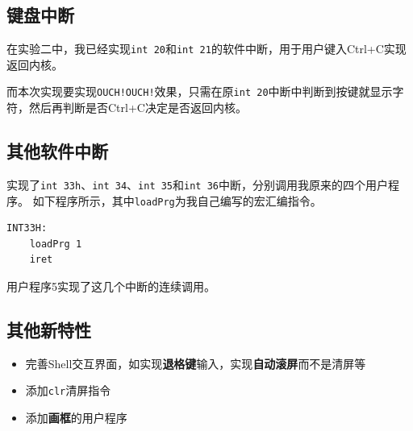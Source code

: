 \documentclass[logo,reportComp]{thesis}
\begin{document}
\subsection{键盘中断}
在实验二中，我已经实现\verb'int 20'和\verb'int 21'的软件中断，用于用户键入Ctrl+C实现返回内核。

而本次实现要实现\verb'OUCH!OUCH!'效果，只需在原\verb'int 20'中断中判断到按键就显示字符，然后再判断是否Ctrl+C决定是否返回内核。

\subsection{其他软件中断}
实现了\verb'int 33h'、\verb'int 34'、\verb'int 35'和\verb'int 36'中断，分别调用我原来的四个用户程序。
如下程序所示，其中\verb'loadPrg'为我自己编写的宏汇编指令。
\begin{lstlisting}[language={[x86masm]Assembler}]
INT33H:
    loadPrg 1
    iret
\end{lstlisting}

用户程序5实现了这几个中断的连续调用。

\subsection{其他新特性}
\begin{itemize}
	\item 完善Shell交互界面，如实现\textbf{退格键}输入，实现\textbf{自动滚屏}而不是清屏等
	\item 添加\verb'clr'清屏指令
	\item 添加\textbf{画框}的用户程序
\end{itemize}
\end{document}
